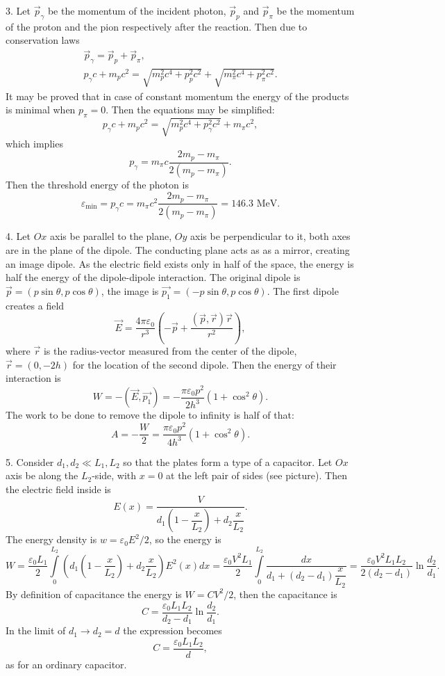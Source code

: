 \documentclass[12pt,a4paper,pdflatex]{disser}
\begin{document}
3. Let $\overrightarrow{p}_\gamma$ be the momentum of the incident photon, $\overrightarrow{p}_p$ and $\overrightarrow{p}_\pi$ be the momentum of the proton and the pion respectively after the reaction. Then due to conservation laws
\begin{gather*}
  \overrightarrow{p}_\gamma=\overrightarrow{p}_p+\overrightarrow{p}_\pi,\\
  p_\gamma c+m_p c^2=\sqrt{m_p^2 c^4+p_p^2 c^2}+\sqrt{m_\pi^2 c^4+p_\pi^2 c^2}.
\end{gather*}
It may be proved that in case of constant momentum the energy of the products is minimal when $p_\pi=0$. Then the equations may be simplified:
$$
  p_\gamma c+m_p c^2=\sqrt{m_p^2 c^4+p_\gamma^2 c^2}+m_\pi c^2,
$$
which implies
$$
  p_\gamma=m_\pi c \frac{2m_p-m_\pi}{2\left(m_p-m_\pi\right)}.
$$
Then the threshold energy of the photon is
$$
  \varepsilon_\text{min}=p_\gamma c=m_\pi c^2 \frac{2m_p-m_\pi}{2\left(m_p-m_\pi\right)}=146.3 \text{ MeV}.
$$

4. Let $Ox$ axis be parallel to the plane, $Oy$ axis be perpendicular to it, both axes are in the plane of the dipole. The conducting plane acts as as a mirror, creating an image dipole. As the electric field exists only in half of the space, the energy is half the energy of the dipole-dipole interaction. The original dipole is $\overrightarrow{p}=(p\sin\theta,p\cos\theta)$, the image is $\overrightarrow{p_1}=(-p\sin\theta,p\cos\theta)$. The first dipole creates a field
$$
  \overrightarrow{E}=\frac{4\pi\varepsilon_0}{r^3}\left(-\overrightarrow{p}+\frac{(\overrightarrow{p},\overrightarrow{r})\overrightarrow{r}}{r^2}\right),
$$
where $\overrightarrow{r}$ is the radius-vector measured from the center of the dipole, $\overrightarrow{r}=(0,-2h)$ for the location of the second dipole. Then the energy of their interaction is
$$
  W=-(\overrightarrow{E},\overrightarrow{p_1})=-\frac{\pi\varepsilon_0 p^2}{2h^3}\left(1+\cos^2 \theta\right).
$$
The work to be done to remove the dipole to infinity is half of that:
$$
  A=-\frac{W}{2}=\frac{\pi\varepsilon_0 p^2}{4h^3}\left(1+\cos^2 \theta\right).
$$

5. Consider $d_1,d_2\ll L_1,L_2$ so that the plates form a type of a capacitor. Let $Ox$ axis be along the $L_2$-side, with $x=0$ at the left pair of sides (see picture). Then the electric field inside is
$$
  E(x)=\frac{V}{d_1 \left(1-\dfrac{x}{L_2}\right)+d_2 \dfrac{x}{L_2}}.
$$
The energy density is $w=\varepsilon_0 E^2/2$, so the energy is
$$
  W=\frac{\varepsilon_0 L_1}{2}\int\limits_0^{L_2} \left(d_1 \left(1-\frac{x}{L_2}\right)+d_2 \frac{x}{L_2}\right)E^2(x)dx=\frac{\varepsilon_0 V^2 L_1}{2}\int\limits_0^{L_2} \frac{dx}{d_1+\left(d_2-d_1\right)\dfrac{x}{L_2}}=\frac{\varepsilon_0 V^2 L_1 L_2}{2\left(d_2-d_1\right)}\ln\frac{d_2}{d_1}.
$$
By definition of capacitance the energy is $W=CV^2/2$, then the capacitance is
$$
  C=\frac{\varepsilon_0 L_1 L_2}{d_2-d_1}\ln\frac{d_2}{d_1}.
$$
In the limit of $d_1\to d_2=d$ the expression becomes
$$
  C=\frac{\varepsilon_0 L_1 L_2}{d},
$$
as for an ordinary capacitor.
\end{document}
